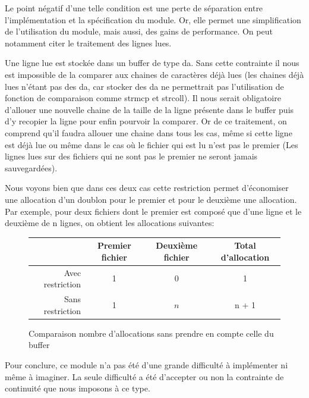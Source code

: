 \documentclass[12pt]{article}
\begin{document}
    Le point négatif d'une telle condition est une perte de séparation 
    entre l'implémentation et la spécification du module. Or, elle permet 
    une simplification de l'utilisation du module, mais aussi, des gains de 
    performance. On peut notamment citer le traitement des lignes lues. 

    Une ligne lue est stockée dans un buffer de type da. Sans cette contrainte 
    il nous est impossible de la comparer aux chaines de caractères déjà lues 
    (les chaines déjà lues n'étant pas des da, car stocker des da ne 
    permettrait pas l'utilisation de fonction de comparaison comme strmcp 
    et strcoll). Il nous serait obligatoire d'allouer une nouvelle chaine 
    de la taille de la ligne présente dans le buffer puis d'y recopier la 
    ligne pour enfin pourvoir la comparer. Or de ce traitement, on comprend 
    qu'il faudra allouer une chaine dans tous les cas, même si cette ligne
    est déjà lue ou même dans le cas où le fichier qui est lu n'est pas le 
    premier (Les lignes lues sur des fichiers qui ne sont pas le premier ne 
    seront jamais sauvegardées). 
    
    Nous voyons bien que dans ces deux cas cette restriction permet 
    d'économiser une allocation d'un doublon pour le premier et pour le 
    deuxième une allocation. Par exemple, pour deux fichiers dont le 
    premier est composé que d'une ligne et le deuxième de n lignes, on 
    obtient les allocations suivantes\@:

    \vphantom{}

    \begin{figure}[ht]
        \centering
        \begin{tabular}{|r|c|c|c|}
            \hline{}
                \cellcolor{gray!25}     & Premier fichier & Deuxième fichier & 
                Total d'allocation \\
            \hline{}
            Avec restriction  & 1 & 0 & 1 \\
            \hline{}
            Sans restriction & 1 & $n$ & n + 1\\
            \hline
        \end{tabular}
        \caption{Comparaison nombre d'allocations sans prendre en compte 
        celle du buffer}\label{tab-compar-da}
    \end{figure}

    Pour conclure, ce module n'a pas été d'une grande difficulté à 
    implémenter ni même à imaginer. La seule difficulté a été  
    d'accepter ou non la contrainte de continuité que nous imposons à ce type.
\end{document}

